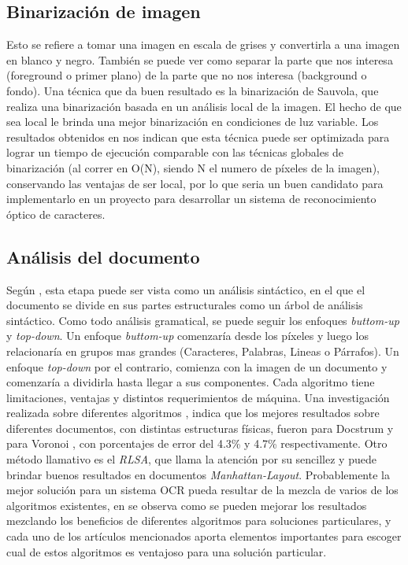 \documentclass[a4paper, 11pt, oneside]{article}
\begin{document}
	\subsection{Binarización de imagen}
	Esto se refiere a tomar una imagen en escala de grises y convertirla a una 
	imagen en blanco y negro. También se puede ver como separar la parte que nos interesa
	(foreground o primer plano) de la parte que no nos interesa (background o fondo).
	Una técnica que da buen resultado es la binarización de Sauvola,
	que realiza una binarización basada en un análisis local de la imagen. El hecho de
	que sea local le brinda una mejor binarización en condiciones de luz variable. Los 
        resultados obtenidos en\cite{ocropus2} nos indican que esta técnica puede ser
        optimizada para lograr un tiempo de ejecución comparable con las técnicas globales de 
        binarización (al correr en O(N), siendo N el numero de píxeles de la imagen), conservando
	las ventajas de ser local, por lo que seria un buen candidato para implementarlo en un 
        proyecto para desarrollar un sistema de reconocimiento óptico de caracteres.
	
	\subsection{Análisis del documento}
	Según \cite{doc_analysis2}, esta etapa puede ser vista como un análisis sintáctico,
	en el que el documento se divide en sus partes estructurales como un árbol de análisis
	sintáctico. Como todo análisis gramatical, se puede seguir los enfoques
	\textit{buttom-up} y \textit{top-down}. Un enfoque \textit{buttom-up} comenzaría desde
	los píxeles y luego los relacionaría en grupos mas grandes (Caracteres, Palabras, Lineas
	o Párrafos). Un enfoque \textit{top-down} por el contrario, comienza con la imagen de un
	documento y comenzaría a dividirla hasta llegar a sus componentes.
	Cada algoritmo tiene limitaciones, ventajas y distintos requerimientos de máquina.
	Una investigación realizada sobre diferentes algoritmos \cite{benchmark1}, indica que los
	mejores resultados sobre diferentes documentos, con distintas estructuras físicas,
	fueron para Docstrum \cite{docstrum93} y para Voronoi \cite{voronoi1}, con porcentajes
	de error del 4.3\% y 4.7\% respectivamente. Otro método
	llamativo es el \textit{RLSA}, que llama la atención por su sencillez y puede brindar
	buenos resultados en documentos \textit{Manhattan-Layout}\cite{RLSA1}.
	Probablemente la mejor solución para un sistema OCR pueda resultar de la mezcla de
	varios de los algoritmos existentes, en \cite{voronoi2} se observa como se pueden mejorar
	los resultados mezclando los beneficios de diferentes algoritmos para soluciones
	particulares, y cada uno de los artículos mencionados aporta elementos importantes para
        escoger cual de estos algoritmos es ventajoso para una solución particular.
	
\end{document}
